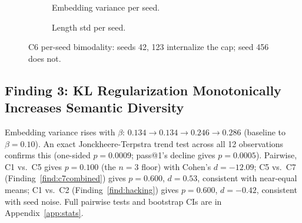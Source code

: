 \documentclass{article}
\begin{document}
\begin{figure}[t]
\centering
\begin{subfigure}[t]{0.48\textwidth}
\centering
{}
\caption{Embedding variance per seed.}
\end{subfigure}
\hfill
\begin{subfigure}[t]{0.48\textwidth}
\centering
{}
\caption{Length std per seed.}
\end{subfigure}
\caption{C6 per-seed bimodality: seeds 42, 123 internalize the cap; seed 456 does not.}
\label{fig:c6_bimodal}
\end{figure}

\subsection{Finding 3: KL Regularization Monotonically Increases Semantic Diversity}
\label{sec:finding3}

Embedding variance rises with $\beta$: $0.134 \rightarrow 0.134 \rightarrow 0.246 \rightarrow 0.286$ (baseline to $\beta=0.10$). An exact Jonckheere-Terpstra trend test across all 12 observations confirms this (one-sided $p=0.0009$; pass@1's decline gives $p=0.0005$). Pairwise, C1 vs.\ C5 gives $p=0.100$ (the $n=3$ floor) with Cohen's $d=-12.09$; C5 vs.\ C7 (Finding~\ref{find:c7combined}) gives $p=0.600$, $d=0.53$, consistent with near-equal means; C1 vs.\ C2 (Finding~\ref{find:hacking}) gives $p=0.600$, $d=-0.42$, consistent with seed noise. Full pairwise tests and bootstrap CIs are in Appendix~\ref{app:stats}.
\end{document}
